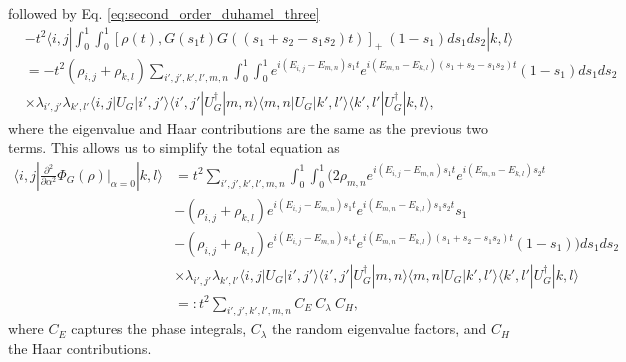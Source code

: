 \documentclass{article}
\newcommand{\ket}[1]{|#1\rangle}
\newcommand{\bra}[1]{\langle #1|}
\begin{document}
followed by Eq. \eqref{eq:second_order_duhamel_three}
\begin{align}
    &-t^2 \bra{i,j} \int_0^1 \int_0^1 [\rho(t), G(s_1 t) G((s_1 + s_2 - s_1 s_2) t)]_+ ~ (1- s_1) ds_1 ds_2 \ket{k,l} \\
    &= -t^2 (\rho_{i,j} + \rho_{k,l}) \sum_{i',j',k',l',m,n} \int_0^1 \int_0^1 e^{i(E_{i,j} - E_{m,n})s_1 t} e^{i(E_{m,n} - E_{k,l})(s_1 + s_2 - s_1 s_2)t} (1-s_1)ds_1 ds_2 \\
    &\times \lambda_{i',j'} \lambda_{k',l'} \bra{i,j} U_G \ket{i',j'} \bra{i',j'} U_G^\dagger \ket{m,n} \bra{m,n} U_G \ket{k',l'} \bra{k',l'} U_G^\dagger \ket{k,l},
\end{align}
where the eigenvalue and Haar contributions are the same as the previous two terms. This allows us to simplify the total equation as
\begin{align}
    \bra{i,j} \frac{\partial^2}{\partial \alpha^2} \Phi_G(\rho) \bigg|_{\alpha = 0} \ket{k,l} &= t^2 \sum_{i',j',k',l',m,n} \int_0^1 \int_0^1 \bigg(  2 \rho_{m,n} e^{i(E_{i,j} - E_{m,n})s_1t} e^{i(E_{m,n} - E_{k,l})s_2 t}  \\
    &- (\rho_{i,j} + \rho_{k,l}) e^{i(E_{i,j} - E_{m,n})s_1 t} e^{i(E_{m,n} - E_{k,l})s_1 s_2 t} s_1 \\
    &- (\rho_{i,j} + \rho_{k,l}) e^{i(E_{i,j} - E_{m,n})s_1 t} e^{i(E_{m,n} - E_{k,l})(s_1 + s_2 - s_1 s_2)t} (1-s_1) \bigg) ds_1 ds_2 \\
    &\times \lambda_{i',j'} \lambda_{k',l'} \bra{i,j} U_G \ket{i',j'} \bra{i',j'} U_G^\dagger \ket{m,n} \bra{m,n} U_G \ket{k',l'} \bra{k',l'} U_G^\dagger \ket{k,l} \\
    &=: t^2 \sum_{i',j',k',l',m,n} C_{E} ~ C_{\lambda} ~ C_{H},
\end{align}
where $C_E$ captures the phase integrals, $C_{\lambda}$ the random eigenvalue factors, and $C_{H}$ the Haar contributions. 
\end{document}

